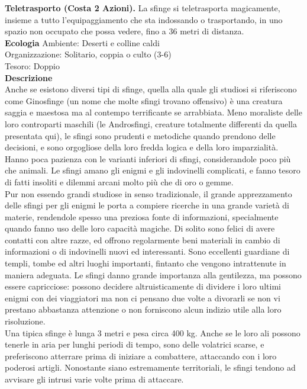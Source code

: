 \begin{multicols}{2}
\textbf{Teletrasporto (Costa 2 Azioni).} La sfinge si teletrasporta magicamente, insieme a tutto l'equipaggiamento che sta indossando o trasportando, in uno spazio non occupato che possa vedere, fino a 36 metri di distanza.\\
\textbf{Ecologia}
Ambiente: Deserti e colline caldi\\
Organizzazione: Solitario, coppia o culto (3-6)\\
Tesoro: Doppio\\
\textbf{Descrizione}\\
Anche se esistono diversi tipi di sfinge, quella alla quale gli studiosi si riferiscono come Ginosfinge (un nome che molte sfingi trovano offensivo) è una creatura saggia e maestosa ma al contempo terrificante se arrabbiata. Meno moraliste delle loro controparti maschili (le Androsfingi, creature totalmente differenti da quella presentata qui), le sfingi sono prudenti e metodiche quando prendono delle decisioni, e sono orgogliose della loro fredda logica e della loro imparzialità. Hanno poca pazienza con le varianti inferiori di sfingi, considerandole poco più che animali. Le sfingi amano gli enigmi e gli indovinelli complicati, e fanno tesoro di fatti insoliti e dilemmi arcani molto più che di oro o gemme.\\

Pur non essendo grandi studiose in senso tradizionale, il grande apprezzamento delle sfingi per gli enigmi le porta a compiere ricerche in una grande varietà di materie, rendendole spesso una preziosa fonte di informazioni, specialmente quando fanno uso delle loro capacità magiche. Di solito sono felici di avere contatti con altre razze, ed offrono regolarmente beni materiali in cambio di informazioni o di indovinelli nuovi ed interessanti. Sono eccellenti guardiane di templi, tombe ed altri luoghi importanti, fintanto che vengono intrattenute in maniera adeguata. Le sfingi danno grande importanza alla gentilezza, ma possono essere capricciose: possono decidere altruisticamente di dividere i loro ultimi enigmi con dei viaggiatori ma non ci pensano due volte a divorarli se non vi prestano abbastanza attenzione o non forniscono alcun indizio utile alla loro risoluzione.\\

Una tipica sfinge è lunga 3 metri e pesa circa 400 kg. Anche se le loro ali possono tenerle in aria per lunghi periodi di tempo, sono delle volatrici scarse, e preferiscono atterrare prima di iniziare a combattere, attaccando con i loro poderosi artigli. Nonostante siano estremamente territoriali, le sfingi tendono ad avvisare gli intrusi varie volte prima di attaccare.\\


\end{multicols}
